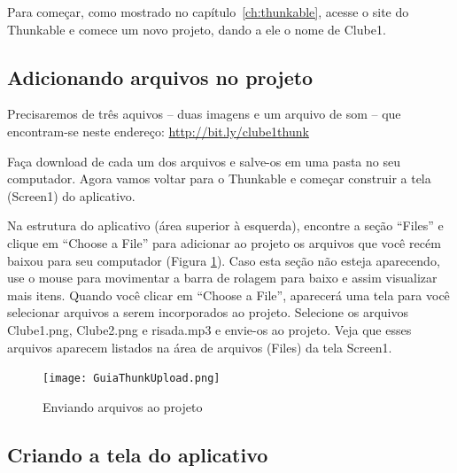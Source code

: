 \documentclass[11pt,fleqn]{book} %
\begin{document}
Para começar, como mostrado no capítulo~\ref{ch:thunkable}, acesse o site do Thunkable e comece um novo projeto, dando a ele o nome de Clube1.

\subsection{Adicionando arquivos no projeto}

Precisaremos de três aquivos -- duas imagens e um arquivo de som -- que encontram-se neste endereço:
 \url{http://bit.ly/clube1thunk}

Faça download de cada um dos arquivos e salve-os em uma pasta no seu computador. Agora vamos voltar para o Thunkable e começar construir a tela (Screen1) do aplicativo. 




Na estrutura do aplicativo (área superior à esquerda), encontre a seção ``Files'' e clique em ``Choose a File'' para adicionar ao projeto os arquivos que você recém baixou para seu computador (Figura \ref{fig:upload}).
Caso esta seção não esteja aparecendo, use o mouse para movimentar a barra de rolagem para baixo e assim visualizar mais itens. Quando você clicar em ``Choose a File'', aparecerá uma tela para você selecionar arquivos a serem incorporados ao projeto. Selecione os arquivos Clube1.png, Clube2.png e risada.mp3 e envie-os ao projeto. Veja que esses arquivos aparecem listados na área de arquivos (Files) da tela Screen1. 

\begin{figure}[H]
 	\centering   
	\texttt{[image: GuiaThunkUpload.png]}
    \caption{Enviando arquivos ao projeto}\label{fig:upload}
\end{figure}

\subsection{Criando a tela do aplicativo}
\end{document}
